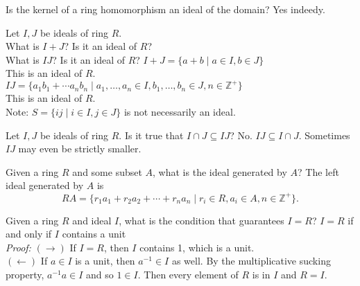 \documentclass[avery5371,grid]{flashcards}
\newcommand{\Z}{\mathbb{Z}}
\newcommand{\inv}{^{-1}}
\begin{document}
\begin{flashcard}[Rings]{Is the kernel of a ring homomorphism an ideal of the domain?}
 Yes indeedy.
\end{flashcard}

\begin{flashcard}[Rings]{Let $I,J$ be ideals of ring $R$.\\ What is $I + J$? Is it an ideal of $R$?\\ What is $IJ$? Is it an ideal of $R$?}
 $I+J = \{a+b \mid a \in I, b \in J\}$\\
 This is an ideal of $R$.\\
 
 $IJ = \{a_1b_1 + \cdots a_n b_n \mid a_1, \ldots, a_n \in I, b_1, \ldots, b_n \in J, n \in \Z^+\}$\\
 This is an ideal of $R$.\\
 
 Note: $S = \{ij \mid i \in I, j \in J \}$ is not necessarily an ideal.
\end{flashcard}

\begin{flashcard}[Rings]{Let $I,J$ be ideals of ring $R$. Is it true that $I \cap J \subseteq IJ$?}
 No. $IJ \subseteq I \cap J$. Sometimes $IJ$ may even be strictly smaller.
\end{flashcard}

\begin{flashcard}[Rings]{Given a ring $R$ and some subset $A$, what is the ideal generated by $A$?}
 The left ideal generated by $A$ is $$RA = \{r_1 a_1 + r_2 a_2 + \cdots + r_n a_n \mid r_i \in R, a_i \in A, n \in \Z^+ \}.$$
\end{flashcard}

\begin{flashcard}[Rings]{Given a ring $R$ and ideal $I$, what is the condition that guarantees $I = R$?}
  $I = R$ if and only if $I$ contains a unit\\
  
  \emph{Proof: } $(\rightarrow)$ If $I = R$, then $I$ contains 1, which is a unit.\\
  
  $(\leftarrow)$ If $a \in I$ is a unit, then $a \inv \in I$ as well. By the multiplicative sucking property, $a \inv a \in I$ and so $1 \in I$. Then every element of $R$ is in $I$ and $R = I$.
\end{flashcard}
\end{document}
